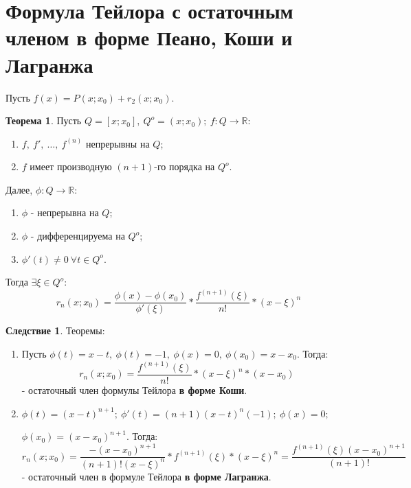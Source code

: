 \documentclass{report}
\theoremstyle{definition}
\newtheorem*{effect}{Следствие}
\newtheorem*{theorem}{Теорема}
\begin{document}
\section{Формула Тейлора с остаточным членом в форме Пеано, Коши и Лагранжа}

Пусть $f(x) = P(x;x_0) + r_2(x;x_0)$.

\begin{theorem}
    Пусть $Q = [x;x_0], \ Q^o = (x;x_0); \ f: Q\rightarrow \mathbb{R}:$
    \begin{enumerate}
        \item $f, \ f', \ \ldots, \ f^{(n)}$ непрерывны на $Q$;
        \item $f$ имеет производную $(n+1)$-го порядка на $Q^o$.
    \end{enumerate}

    Далее, $\phi: Q \rightarrow \mathbb{R}$:
    \begin{enumerate}
        \item $\phi$ - непрерывна на $Q$;
        \item $\phi$ - дифференцируема на $Q^o$;
        \item $\phi'(t) \ne 0 \ \forall t \in Q^o$.
    \end{enumerate}

    Тогда $\exists \xi \in Q^o:$
    \begin{equation*}
        r_n (x;x_0) = \frac{\phi(x) - \phi(x_0)}{\phi'(\xi)} * \frac{f^{(n+1)}(\xi)}{n!} * (x-\xi)^n
    \end{equation*}
\end{theorem}

\begin{effect}
    Теоремы:

    \begin{enumerate}
        \item Пусть $\phi(t) = x-t, \ \phi(t) = -1, \ \phi(x) = 0, \ \phi(x_0) = x-x_0$. Тогда:
              \begin{equation*}
                  r_n(x;x_0) = \frac{f^{(n+1)}(\xi)}{n!} * (x-\xi)^n * (x-x_0)
              \end{equation*} - остаточный член формулы Тейлора \textbf{в форме Коши}.

        \item $\phi(t) = (x-t)^{n+1}; \ \phi'(t) = (n+1)(x-t)^n(-1); \ \phi(x)=0;$

              $\phi(x_0) = (x-x_0)^{n+1}$. Тогда:
              \begin{equation*}
                  r_n(x;x_0) = \frac{-(x-x_0)^{n+1}}{(n+1)!(x-\xi)^n} * f^{(n+1)}(\xi) * (x-\xi)^n =
                  \frac{f^{(n+1)}(\xi)(x-x_0)^{n+1}}{(n+1)!}
              \end{equation*}
              - остаточный член в формуле Тейлора \textbf{в форме Лагранжа}.
    \end{enumerate}
\end{effect}
\end{document}

